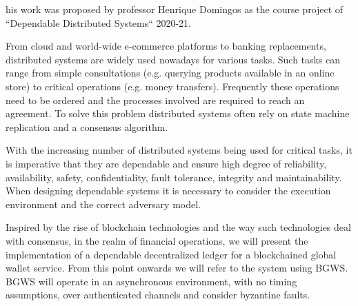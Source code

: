 \documentclass[10pt,journal,compsoc]{IEEEtran}
\begin{document}
	
	\IEEEpeerreviewmaketitle


	his work was proposed by professor Henrique Domingos as the course project of “Dependable Distributed Systems“ 2020-21.

	From cloud and world-wide e-commerce platforms to banking replacements, distributed systems are widely used nowadays for various tasks.
	Such tasks can range from simple consultations (e.g. querying products available in an online store) to critical operations (e.g. money transfers). Frequently these operations need to be ordered and the processes involved are required to reach an agreement. To solve this problem distributed systems often rely on state machine replication and a consensus algorithm.

	With the increasing number of distributed systems being used for critical tasks, it is imperative that they are dependable and ensure high degree of reliability, availability, safety, confidentiality, fault tolerance, integrity and maintainability. When designing dependable systems it is necessary to consider the execution environment and the correct adversary model.
	
	Inspired by the rise of blockchain technologies and the way such technologies deal with consensus, in the realm of financial operations, we will present the implementation of a dependable decentralized ledger for a blockchained global wallet service. From this point onwards we will refer to the system using BGWS.
	BGWS will operate in an asynchronous environment, with no timing assumptions, over authenticated channels and consider byzantine faults. 
\end{document}
